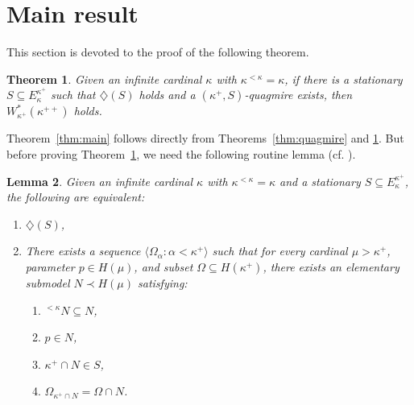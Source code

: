 \documentclass[]{amsart}
\newtheorem{theorem}{Theorem}
\newtheorem{lemma}[theorem]{Lemma}
\theoremstyle{definition}
\theoremstyle{remark}
\begin{document}
\section{Main result}\label{sec:main}

This section is devoted to the proof of the following theorem. 

\begin{theorem}\label{thm:mains}
Given an infinite cardinal $\kappa$ with $\kappa^{< \kappa} = \kappa$, if there is a stationary $S \subseteq E^{\kappa^+}_\kappa$ such that $\diamondsuit(S)$ holds and a $(\kappa^+, S)$-quagmire exists, then $W^*_{\kappa^+}(\kappa^{++})$ holds.
\end{theorem}

Theorem~\ref{thm:main} follows directly from Theorems~\ref{thm:quagmire} and \ref{thm:mains}. But before proving Theorem~\ref{thm:mains}, we need the following routine lemma (cf. \cite[Lemma 2.2]{MR3692231}).

\begin{lemma}\label{lemma:diamond}
Given an infinite cardinal $\kappa$ with $\kappa^{<\kappa} = \kappa$ and a stationary $S \subseteq E^{\kappa^+}_\kappa$, the following are equivalent:
\begin{enumerate}[label={\upshape (\arabic*)}]
\item $\diamondsuit(S)$,
\item There exists a sequence $\langle \Omega_\alpha : \alpha < \kappa^{+}\rangle$ such that for every cardinal $\mu > \kappa^+$, parameter $p \in H(\mu)$, and subset $\Omega \subseteq H(\kappa^{+})$, there exists an elementary submodel $N \prec H(\mu)$ satisfying:
\begin{enumerate}[label={\upshape (\alph*)}]
\item ${}^{<\kappa} N \subseteq N$,
\item $p \in N$,
\item $\kappa^+ \cap N \in S$,
\item $\Omega_{\kappa^+ \cap N} = \Omega \cap N$.
\end{enumerate}
\end{enumerate}
\end{lemma}
 


\begingroup
\setcounter{claim}{0}
\renewcommand{\theclaim}{\getrefnumber{thm:mains}.\arabic{claim}}
\end{document}

